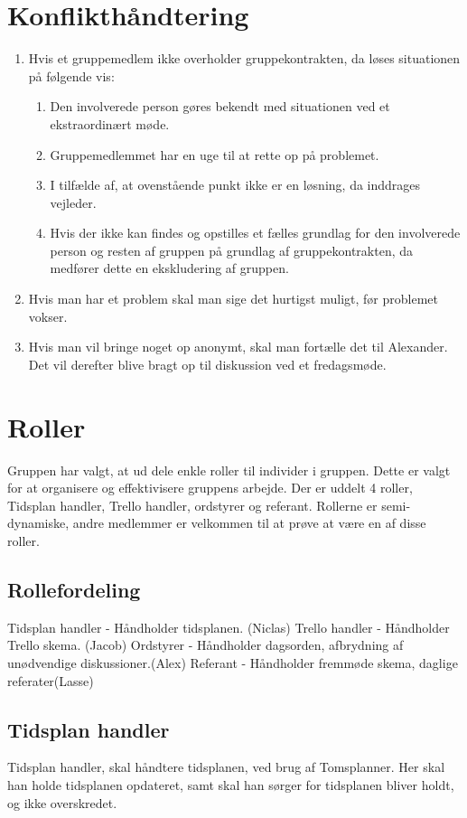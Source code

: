 \section{Konflikthåndtering}
\begin{enumerate}
\item Hvis et gruppemedlem ikke overholder gruppekontrakten, da løses situationen på følgende vis:
\begin{enumerate}
\item Den involverede person gøres bekendt med situationen ved et ekstraordinært møde.
\item Gruppemedlemmet har en uge til at rette op på problemet.
\item I tilfælde af, at ovenstående punkt ikke er en løsning, da inddrages vejleder.
\item Hvis der ikke kan findes og opstilles et fælles grundlag for den involverede person og resten af gruppen på grundlag af gruppekontrakten, da medfører dette en ekskludering af gruppen.
\end{enumerate}
\item Hvis man har et problem skal man sige det hurtigst muligt, før problemet vokser.
\item Hvis man vil bringe noget op anonymt, skal man fortælle det til Alexander. Det vil derefter blive bragt op til diskussion ved et fredagsmøde.
\end{enumerate}

\section{Roller}
Gruppen har valgt, at ud dele enkle roller til individer i gruppen. Dette er valgt for at organisere og effektivisere gruppens arbejde. Der er uddelt 4 roller, Tidsplan handler, Trello handler, ordstyrer og referant. Rollerne er semi-dynamiske, andre medlemmer er velkommen til at prøve at være en af disse roller.

\subsection{Rollefordeling}
Tidsplan handler - Håndholder tidsplanen. (Niclas)
Trello handler - Håndholder Trello skema. (Jacob)
Ordstyrer - Håndholder dagsorden, afbrydning af unødvendige diskussioner.(Alex)
Referant - Håndholder fremmøde skema, daglige referater(Lasse)

\subsection{Tidsplan handler}
Tidsplan handler, skal håndtere tidsplanen, ved brug af Tomsplanner. Her skal han holde tidsplanen opdateret, samt skal han sørger for tidsplanen bliver holdt, og ikke overskredet.


